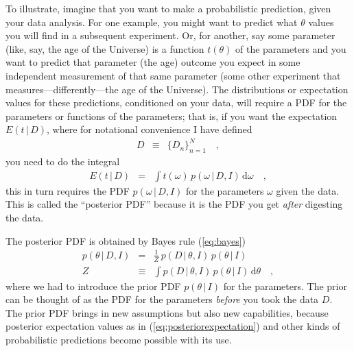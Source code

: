 \documentclass[12pt,twoside]{article}
\newcommand{\setofall}[3]{\{{#1}\}_{{#2}}^{{#3}}}
\newcommand{\dd}{\mathrm{d}}
\newcommand{\given}{\,|\,}
\begin{document}
To illustrate, imagine that you want to make a probabilistic
prediction, given your data analysis. For one example, you might want
to predict what $\theta$ values you will find in a subsequent
experiment.  Or, for another, say some parameter (like, say, the age
of the Universe) is a function $t(\theta)$ of the parameters and you
want to predict that parameter (the age) outcome you expect in some
independent measurement of that same parameter (some other experiment
that measures---differently---the age of the Universe).  The
distributions or expectation values for these predictions, conditioned
on your data, will require a PDF for the parameters or functions of
the parameters; that is, if you want the expectation $E(t \given D)$,
where for notational convenience I have defined
\begin{eqnarray}\displaystyle
D &\equiv& \setofall{D_n}{n=1}{N}
\quad ,
\end{eqnarray}
you need to do the integral
\begin{eqnarray}\displaystyle\label{eq:posteriorexpectation}
E(t \given D) &=& \int t(\omega)\,p(\omega \given D, I)\,\dd\omega
\quad ,
\end{eqnarray}
this in turn requires the PDF $p(\omega \given D, I)$ for the
parameters $\omega$ given the data.  This is called the ``posterior
PDF'' because it is the PDF you get \emph{after} digesting the data.

The posterior PDF is obtained by Bayes rule (\ref{eq:bayes})
\begin{eqnarray}\displaystyle\label{eq:posterior}
p(\theta \given D, I) &=& \frac{1}{Z}\,p(D \given \theta, I)\,p(\theta \given I)
\\
Z &\equiv& \int p(D \given \theta, I)\,p(\theta \given I)\,\dd\theta
\quad ,
\end{eqnarray}
where we had to introduce the prior PDF $p(\theta \given I)$ for the
parameters.  The prior can be thought of as the PDF for the parameters
\emph{before} you took the data $D$.  The prior PDF brings in new
assumptions but also new capabilities, because posterior expectation
values as in (\ref{eq:posteriorexpectation}) and other kinds of
probabilistic predictions become possible with its use.
\end{document}

